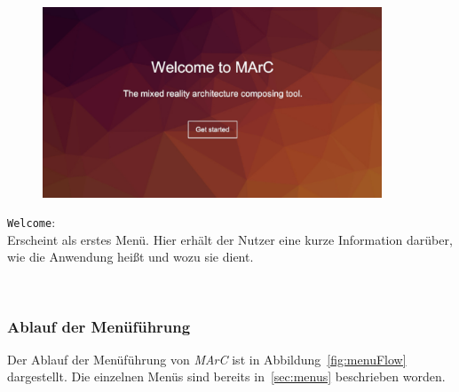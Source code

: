 \begin{minipage}{0.6\textwidth}
	\begin{figure}[H] 
		\includegraphics[trim=3cm 2cm 3cm 2cm, clip, width=0.9\textwidth]{Bilder/Welcome.jpg}
			\label{fig:Welcome}
	\end{figure}
\end{minipage}
\begin{minipage}{0.4\textwidth}
	\texttt{Welcome}:\\
	Erscheint als erstes Menü. Hier erhält der Nutzer eine kurze Information darüber, wie die Anwendung heißt und wozu sie dient.
\end{minipage}\\

\subsubsection{Ablauf der Menüführung}\label{sec:menuAblauf}
Der Ablauf der Menüführung von \textit{MArC} ist in Abbildung~\ref{fig:menuFlow} dargestellt. Die einzelnen Menüs sind bereits in~\ref{sec:menus} beschrieben worden.

